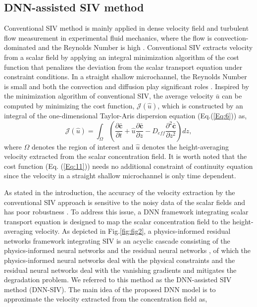 \documentclass{article}
\begin{document}
\subsection{DNN-assisted SIV method}
Conventional SIV method is mainly applied in dense velocity field and turbulent flow measurement in experimental fluid mechanics, where the flow is convection-dominated and the Reynolds Number is high \citep{feng2007simultaneous,corpetti2009pressure}. Conventional SIV extracts velocity from a scalar field by applying an integral minimization algorithm of the cost function that penalizes the deviation from the scalar transport equation under constraint conditions. In a straight shallow microchannel, the Reynolds Number is small and both the convection and diffusion play significant roles \citep{li2018transmission}. Inspired by the minimization algorithm of conventional SIV, the average velocity $\bar{u}$ can be computed by minimizing the cost function, $\mathcal{J}\left(\hat{u}\right)$, which is constructed by an integral of the one-dimensional Taylor-Aris dispersion equation (Eq.(\ref{Eq:6})) as,
\begin{equation}
	\mathcal{J}\left(\hat{u}\right)=\int_\Omega\left(\frac{\partial\bar{\mathbf{c}} }{\partial t}+\hat{u}\frac{\partial\bar{\mathbf{c}} }{\partial z}-D_{eff}\frac{\partial^2\bar{\mathbf{c}} }{\partial z^2}\right)dz,
	\label{Eq:11}
\end{equation}
where $\Omega$ denotes the region of interest and $\hat{u}$ denotes the height-averaging velocity extracted from the scalar concentration field. It is worth noted that the cost function (Eq. (\ref{Eq:11})) needs no additional constraint of continuity equation since the velocity in a straight shallow microchannel is only time dependent.\par
As stated in the introduction, the accuracy of the velocity extraction by the conventional SIV approach is sensitive to the noisy data of the scalar fields and has poor robustness \citep{wallace2010measurement,burman2020stability}. To address this issue, a DNN framework integrating scalar transport equation is designed to map the scalar concentration field  to the height-averaging velocity. As depicted in Fig.\ref{fig:fig2}, a physics-informed residual networks framework integrating SIV is an acyclic cascade consisting of the physics-informed neural networks \citep{raissi2019physics} and the residual neural networks \citep{he2016deep}, of which the physics-informed neural networks deal with the physical constraints and the residual neural networks deal with the vanishing gradients and mitigates the degradation problem. We referred to this method as the DNN-assisted SIV method (DNN-SIV). The main idea of the proposed DNN model is to approximate the velocity extracted from the concentration field as,
\end{document}
